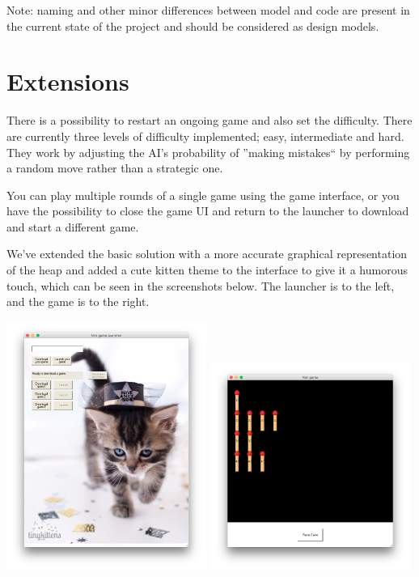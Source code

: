 \documentclass[10pt]{scrartcl}
\begin{document}
Note: naming and other minor differences between model and code are present in the current state of the project and should be considered as design models.
\section{Extensions}
There is a possibility to restart an ongoing game and also set the difficulty. There are currently three levels of difficulty implemented; easy, intermediate and hard. They work by adjusting the AI's probability of ''making mistakes`` by performing a random move rather than a strategic one.

You can play multiple rounds of a single game using the game interface, or you have the possibility to close the game UI and return to the launcher to download and start a different game.

We've extended the basic solution with a more accurate graphical representation of the heap and added a cute kitten theme to the interface to give it a humorous touch, which can be seen in the screenshots below. The launcher is to the left, and the game is to the right.
\begin{center}
\includegraphics[width=0.49\textwidth]{launcher_ui} \includegraphics[width=0.49\textwidth]{game_ui}
\end{center}
\end{document}
